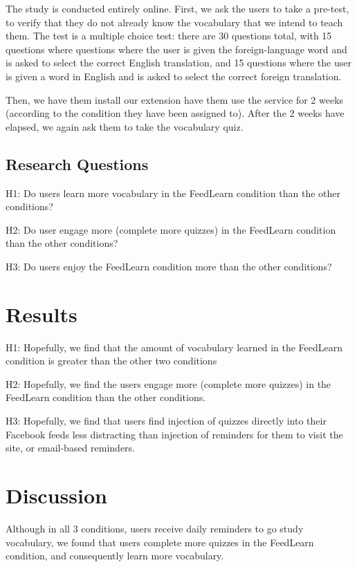 \documentclass{chi-ext}
\begin{document}
The study is conducted entirely online. First, we ask the users to take a pre-test, to verify that they do not already know the vocabulary that we intend to teach them. The test is a multiple choice test: there are 30 questions total, with 15 questions where questions where the user is given the foreign-language word and is asked to select the correct English translation, and 15 questions where the user is given a word in English and is asked to select the correct foreign translation.

Then, we have them install our extension have them use the service for 2 weeks (according to the condition they have been assigned to). After the 2 weeks have elapsed, we again ask them to take the vocabulary quiz.

\subsection{Research Questions}

H1: Do users learn more vocabulary in the FeedLearn condition than the other conditions?

H2: Do user engage more (complete more quizzes) in the FeedLearn condition than the other conditions?

H3: Do users enjoy the FeedLearn condition more than the other conditions?

\section{Results}

H1: Hopefully, we find that the amount of vocabulary learned in the FeedLearn condition is greater than the other two conditions

H2: Hopefully, we find the users engage more (complete more quizzes) in the FeedLearn condition than the other conditions.

H3: Hopefully, we find that users find injection of quizzes directly into their Facebook feeds less distracting than injection of reminders for them to visit the site, or email-based reminders.

\section{Discussion}

Although in all 3 conditions, users receive daily reminders to go study vocabulary, we found that users complete more quizzes in the FeedLearn condition, and consequently learn more vocabulary.
\end{document}

